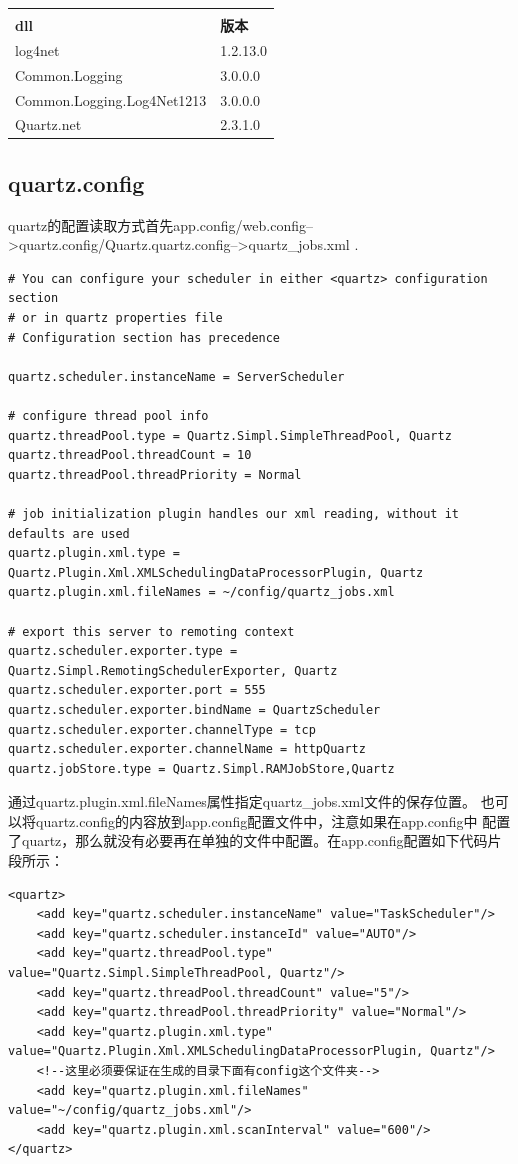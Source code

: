 \documentclass{book}
\begin{document}
\begin{tabular}{ll}
	\multirow{1}{*}{}			
	& \multicolumn{1}{c}{}\\
	\textbf{dll} & \textbf{版本}\\
	log4net & 1.2.13.0\\
	Common.Logging & 3.0.0.0\\
	Common.Logging.Log4Net1213 & 3.0.0.0\\
	Quartz.net & 2.3.1.0\\							
\end{tabular}


\subsection{quartz.config}

quartz的配置读取方式首先app.config/web.config-->quartz.config/Quartz.quartz.config-->quartz\_jobs.xml .

\begin{lstlisting}
# You can configure your scheduler in either <quartz> configuration section  
# or in quartz properties file  
# Configuration section has precedence  

quartz.scheduler.instanceName = ServerScheduler  

# configure thread pool info  
quartz.threadPool.type = Quartz.Simpl.SimpleThreadPool, Quartz  
quartz.threadPool.threadCount = 10  
quartz.threadPool.threadPriority = Normal  

# job initialization plugin handles our xml reading, without it defaults are used  
quartz.plugin.xml.type = Quartz.Plugin.Xml.XMLSchedulingDataProcessorPlugin, Quartz  
quartz.plugin.xml.fileNames = ~/config/quartz_jobs.xml  

# export this server to remoting context  
quartz.scheduler.exporter.type = Quartz.Simpl.RemotingSchedulerExporter, Quartz  
quartz.scheduler.exporter.port = 555  
quartz.scheduler.exporter.bindName = QuartzScheduler  
quartz.scheduler.exporter.channelType = tcp  
quartz.scheduler.exporter.channelName = httpQuartz 
quartz.jobStore.type = Quartz.Simpl.RAMJobStore,Quartz
\end{lstlisting}

通过quartz.plugin.xml.fileNames属性指定quartz\_jobs.xml文件的保存位置。
也可以将quartz.config的内容放到app.config配置文件中，注意如果在app.config中
配置了quartz，那么就没有必要再在单独的文件中配置。在app.config配置如下代码片段所示：
\begin{lstlisting}
<quartz>
	<add key="quartz.scheduler.instanceName" value="TaskScheduler"/>
	<add key="quartz.scheduler.instanceId" value="AUTO"/>
	<add key="quartz.threadPool.type" value="Quartz.Simpl.SimpleThreadPool, Quartz"/>
	<add key="quartz.threadPool.threadCount" value="5"/>
	<add key="quartz.threadPool.threadPriority" value="Normal"/>
	<add key="quartz.plugin.xml.type" value="Quartz.Plugin.Xml.XMLSchedulingDataProcessorPlugin, Quartz"/>
	<!--这里必须要保证在生成的目录下面有config这个文件夹-->
	<add key="quartz.plugin.xml.fileNames" value="~/config/quartz_jobs.xml"/>
	<add key="quartz.plugin.xml.scanInterval" value="600"/>   
</quartz>
\end{lstlisting}
\end{document}
